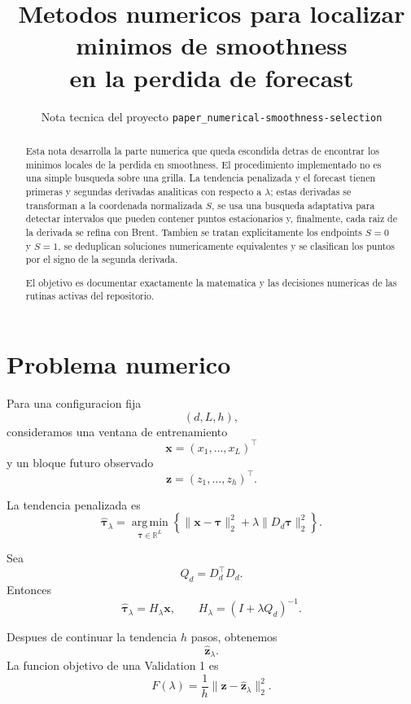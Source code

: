 \documentclass[11pt]{article}
\title{Metodos numericos para localizar minimos de smoothness\\
en la perdida de forecast}
\author{Nota tecnica del proyecto \texttt{paper\_numerical-smoothness-selection}}
\date{}
\newcommand{\R}{\mathbb{R}}
\newcommand{\argmin}{\operatorname*{arg\,min}}
\begin{document}
\maketitle

\begin{abstract}
Esta nota desarrolla la parte numerica que queda escondida detras de
encontrar los minimos locales de la perdida en smoothness. El procedimiento
implementado no es una simple busqueda sobre una grilla. La tendencia
penalizada y el forecast tienen primeras y segundas derivadas analiticas con
respecto a \(\lambda\); estas derivadas se transforman a la coordenada
normalizada \(S\), se usa una busqueda adaptativa para detectar intervalos que
pueden contener puntos estacionarios y, finalmente, cada raiz de la derivada
se refina con Brent. Tambien se tratan explicitamente los endpoints
\(S=0\) y \(S=1\), se deduplican soluciones numericamente equivalentes y se
clasifican los puntos por el signo de la segunda derivada.

El objetivo es documentar exactamente la matematica y las decisiones numericas
de las rutinas activas del repositorio.
\end{abstract}

\tableofcontents

\section{Problema numerico}

Para una configuracion fija
\[
(d,L,h),
\]
consideramos una ventana de entrenamiento
\[
\bm x=(x_1,\ldots,x_L)^\top
\]
y un bloque futuro observado
\[
\bm z=(z_1,\ldots,z_h)^\top.
\]

La tendencia penalizada es
\begin{equation}
\widehat{\bm\tau}_\lambda
=
\argmin_{\bm\tau\in\R^L}
\left\{
\|\bm x-\bm\tau\|_2^2
+
\lambda\|D_d\bm\tau\|_2^2
\right\}.
\label{eq:pls}
\end{equation}

Sea
\[
Q_d=D_d^\top D_d.
\]
Entonces
\begin{equation}
\widehat{\bm\tau}_\lambda
=
H_\lambda\bm x,
\qquad
H_\lambda=(I+\lambda Q_d)^{-1}.
\label{eq:smoother}
\end{equation}

Despues de continuar la tendencia \(h\) pasos, obtenemos
\[
\widehat{\bm z}_\lambda.
\]
La funcion objetivo de una Validation 1 es
\begin{equation}
F(\lambda)
=
\frac{1}{h}
\|\bm z-\widehat{\bm z}_\lambda\|_2^2.
\label{eq:forecast-loss}
\end{equation}
\end{document}

